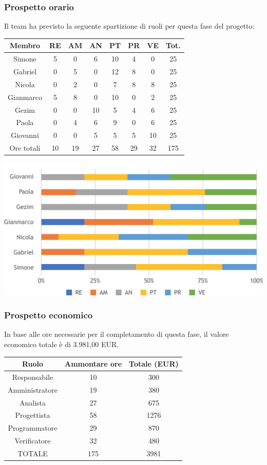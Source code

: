 \subsubsection{Prospetto orario}
Il team ha previsto la seguente spartizione di ruoli per questa fase del progetto:
\\
\begin{center}
\begin{tabular}{ |c|c|c|c|c|c|c|c|  }
 \hline
 Membro 		& RE 	& AM 	& AN 	& PT 	& PR 	& VE 	& Tot.\\
 \hline\hline
 Simone			& 5 		& 0		& 6 	& 10 	& 4 		& 0 		& 25\\
 Gabriel		& 0 		& 5 		& 0 	& 12		& 8 		& 0 		& 25\\
 Nicola			& 0 		& 2 		& 0 	& 7 		& 8 		& 8 		& 25\\
 Gianmarco		& 5 		& 8 		& 0 	& 10 	& 0 		& 2 		& 25\\
 Gezim			& 0 		& 0 		& 10 	& 5 		& 4 		& 6	 	& 25\\
 Paola			& 0 		& 4 		& 6 	& 9 		& 0 		& 6 		& 25\\
 Giovanni		& 0 		& 0	 	& 5 	& 5 		& 5 		& 10  	& 25\\
 \hline\hline
 Ore totali		& 10		& 19		& 27 	& 58	 	& 29 	& 32 	& 175\\
  \hline
\end{tabular}
\end{center}
\includegraphics[width=\textwidth]{res/img/hi334}
\subsubsection{Prospetto economico}
In base alle ore necessarie per il completamento di questa fase, il valore economico totale è di 3.981,00 EUR.
\begin{center}
\begin{tabular}{ |c|c|c|  }
 \hline
 Ruolo 		& Ammontare ore 	& Totale (EUR)\\
 	\hline
 \hline
 	Responsabile	& 10 	& 300\\
	Amministratore	& 19		& 380\\
	Analista		& 27 	& 675\\
	Progettista		& 58		& 1276\\
	Programmatore	& 29		& 870\\
	Verificatore	& 32 	& 480\\
 \hline\hline
 TOTALE		& 175		& 3981\\
  \hline
\end{tabular}
\end{center}

